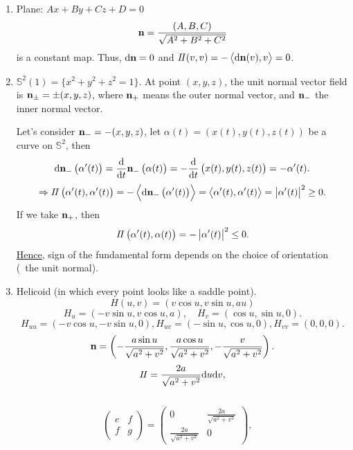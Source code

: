 \begin{example}
    \begin{enumerate}[(1)]
        \hfill
        \item Plane: \(Ax +B y+C z+D=0 \)
        \[\vb{n}=\frac{(A,B,C)}{\sqrt{A^2+B^2+C^2}}\]
        is a constant map. Thus, 
        \(
            \dd\vb{n}=0    
        \) and \(I\!I(v,v)=-\left\langle \dd\vb{n}(v),v\right\rangle=0\).
        \item \(\mathbb{S}^2(1)=\{x^2+y^2+z^2=1\}\).
        At point \((x,y,z)\), the unit normal vector field is 
        \(\vb{n}_{\pm}=\pm (x,y,z)\), where \(\vb{n}_+\) means 
        the outer normal vector, and \(\vb{n}_-\) the inner normal 
        vector.

        Let's consider \(\vb{n}_-=-(x,y,z)\), let \(\alpha(t)=\left(
        x(t),y(t),z(t)\right)\) be a curve on \(\mathbb{S}^2\), then 
        \[
            \dd\vb{n}_-\left(\alpha'(t)\right)
            =\dv{t}\vb{n}_- \left(\alpha(t)\right)
            =-\dv{t}\left(x(t),y(t),z(t)\right)
            =-\alpha'(t)    
        .\]
        \[\Rightarrow
            I\!I\left(\alpha'(t),\alpha'(t)\right)
            =-\left\langle \dd\vb{n}_-\left(\alpha'(t)\right)
            \right\rangle=\left\langle\alpha'(t),\alpha'(t)
            \right\rangle=\left|\alpha'(t)\right|^2\ge 0.
        \]
        If we take \(\vb{n}_+\), then 
        \[I\!I\left(\alpha'(t),\alpha(t)\right)=
        -\left|\alpha'(t)\right|^2\le 0.\]
        \underline{Hence}, sign of the  fundamental form
    depends on the choice of orientation (\ie\ the unit normal).
    \item Helicoid (in which every point looks like a saddle point).
    \[H(u,v)=(v\cos u,v\sin u,a u)\]
    \[H_u=(-v\sin u,v\cos u,a),\quad H_v=(\cos u,\sin u,0).\]
    \[H_{uu}=(-v\cos u,-v\sin u,0),H_{uv}=(-\sin u,\cos u,0),
    H_{vv}=(0,0,0).
    \]
    \[
        \vb{n}=\left(-\frac{a\sin u}{\sqrt{a^2+v^2}},
        \frac{a\cos u}{\sqrt{a^2+v^2}},
        -\frac{v}{\sqrt{a^2+v^2}}
        \right).    
    \]
    \[
        I\!I=\frac{2a}{\sqrt{a^2+v^2}}\dd u\dd v    ,
    \]
    \ie\ 
    \[
        \begin{pmatrix}
            e&f\\
            f&g
        \end{pmatrix}=\begin{pmatrix}
            0&\frac{2a}{\sqrt{a^2+v^2}}\\
            \frac{2a}{\sqrt{a^2+v^2}}&0
        \end{pmatrix},\quad
\]
\end{enumerate}
\end{example}
